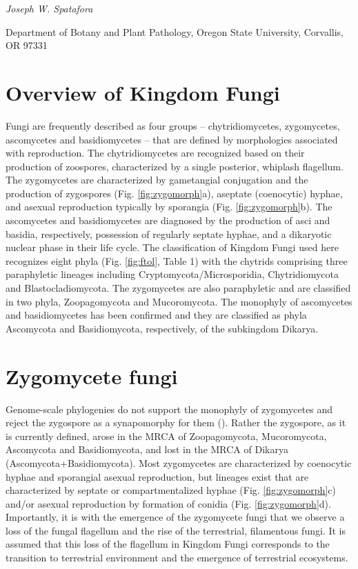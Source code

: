 \documentclass[]{book}
\begin{document}
\emph{Joseph W. Spatafora}

Department of Botany and Plant Pathology, Oregon State University,
Corvallis, OR 97331

\section{Overview of Kingdom Fungi}\label{overview-of-kingdom-fungi}

Fungi are frequently described as four groups -- chytridiomycetes,
zygomycetes, ascomycetes and basidiomycetes -- that are defined by
morphologies associated with reproduction. The chytridiomycetes are
recognized based on their production of zoospores, characterized by a
single posterior, whiplash flagellum. The zygomycetes are characterized
by gametangial conjugation and the production of zygospores (Fig.
\ref{fig:zygomorph}a), aseptate (coenocytic) hyphae, and asexual
reproduction typically by sporangia (Fig. \ref{fig:zygomorph}b). The
ascomycetes and basidiomycetes are diagnosed by the production of asci
and basidia, respectively, possession of regularly septate hyphae, and a
dikaryotic nuclear phase in their life cycle. The classification of
Kingdom Fungi used here recognizes eight phyla (Fig. \ref{fig:ftol},
Table 1) with the chytrids comprising three paraphyletic lineages
including Cryptomycota/Microsporidia, Chytridiomycota and
Blastocladiomycota. The zygomycetes are also paraphyletic and are
classified in two phyla, Zoopagomycota and Mucoromycota. The monophyly
of ascomycetes and basidiomycetes has been confirmed and they are
classified as phyla Ascomycota and Basidiomycota, respectively, of the
subkingdom Dikarya.

\section{Zygomycete fungi}\label{zygomycete-fungi}

Genome-scale phylogenies do not support the monophyly of zygomycetes and
reject the zygospore as a synapomorphy for them
(\citet{Spatafora_2016}). Rather the zygospore, as it is currently
defined, arose in the MRCA of Zoopagomycota, Mucoromycota, Ascomycota
and Basidiomycota, and lost in the MRCA of Dikarya
(Ascomycota+Basidiomycota). Most zygomycetes are characterized by
coenocytic hyphae and sporangial asexual reproduction, but lineages
exist that are characterized by septate or compartmentalized hyphae
(Fig. \ref{fig:zygomorph}c) and/or asexual reproduction by formation of
conidia (Fig. \ref{fig:zygomorph}d). Importantly, it is with the
emergence of the zygomycete fungi that we observe a loss of the fungal
flagellum and the rise of the terrestrial, filamentous fungi. It is
assumed that this loss of the flagellum in Kingdom Fungi corresponds to
the transition to terrestrial environment and the emergence of
terrestrial ecosystems.
\end{document}
